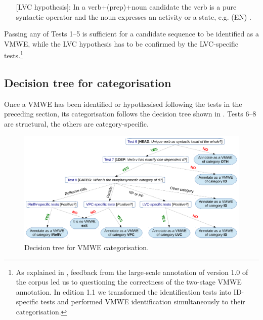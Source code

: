 \documentclass[output=paper,
modfonts,
]{langscibook}
\begin{document}
\begin{itemize}
\item[][LVC hypothesis]: In a verb+(prep)+noun candidate the verb is a pure syntactic operator and the noun expresses an activity or a state, e.g. (EN) .
\end{itemize}
Passing any of Tests 1--5 is sufficient for a candidate sequence to be identified as a VMWE, while the LVC hypothesis has to be confirmed by the LVC-specific tests.\footnote{As explained in , feedback from the large-scale annotation of version 1.0 of the corpus led us to questioning the correctness of the two-stage VMWE annotation. In edition 1.1 we transformed the identification tests into ID-specific tests and performed VMWE identification simultaneously to their categorisation.}

\subsection{Decision tree for categorisation}
\label{sec:decision-tree}
%
Once a VMWE has been identified or hypothesised following the tests in the preceding section, its categorisation follows the decision tree shown in . Tests 6--8 are structural, the others are category-specific.

\begin{figure}
\includegraphics[width=1\textwidth]{figures/decision-tree.pdf}
\caption{Decision tree for VMWE categorisation.}
\label{fig:decision-tree}
\end{figure}

\end{document}
